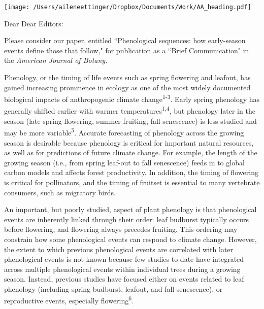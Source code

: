 \documentclass[10.95pt,a4paper]{letter}
\begin{document}
%

\begin{letter}{}
\texttt{[image: /Users/aileneettinger/Dropbox/Documents/Work/AA\_heading.pdf]}

\opening{Dear Dear Editors:}
Please consider our paper, entitled ``Phenological sequences: how early-season events define those that follow," for publication as a ``Brief Communication" in the \emph{American Journal of Botany.}

Phenology, or the timing of life events such as spring flowering and leafout, has gained increasing prominence in ecology as one of the most widely documented biological impacts of anthropogenic climate change\textsuperscript{1-3}. Early spring phenology has generally shifted earlier with warmer temperatures\textsuperscript{1,4}, but phenology later in the season (late spring flowering, summer fruiting, fall senescence) is less studied and may be more variable\textsuperscript{5}.  Accurate forecasting of phenology across the growing season is desirable because phenology is critical for important natural resources, as well as for predictions of future climate change. For example, the length of the growing season (i.e., from spring leaf-out to fall senescence) feeds in to global carbon models and affects forest productivity. In addition, the timing of flowering is critical for pollinators, and the timing of fruitset is essential to many vertebrate consumers, such as migratory birds. %

An important, but poorly studied, aspect of plant phenology is that phenological events are inherently linked through their order: leaf budburst typically occurs before flowering, and flowering always precedes fruiting. This ordering may constrain how some phenological events can respond to climate change. However, the extent to which previous phenological events are correlated with later phenological events is not known because few studies to date have integrated across multiple phenological events within individual trees during a growing season. Instead, previous studies have focused either on events related to leaf phenology (including spring budburst, leafout, and fall senescence), or reproductive events, especially flowering\textsuperscript{6}. 



\end{letter}
\end{document}

